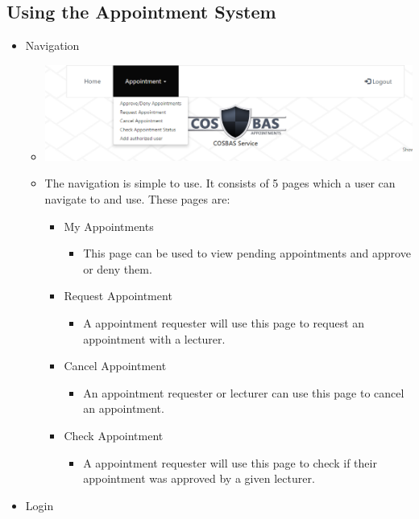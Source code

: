 \subsection{Using the Appointment System}
	\begin{itemize}
		\item Navigation
			\begin{itemize}
				\item \includegraphics[width=\linewidth]{images/Screenshots/Navigation.png}
				\item The navigation is simple to use. It consists of 5 pages which a user can navigate to and use. These pages are:
				\begin{itemize}
					\item My Appointments
						\begin{itemize}
							\item This page can be used to view pending appointments and approve or deny them.
						\end{itemize}
					\item Request Appointment
						\begin{itemize}
							\item A appointment requester will use this page to request an appointment with a lecturer.
						\end{itemize}
					\item Cancel Appointment
						\begin{itemize}
							\item An appointment requester or lecturer can use this page to cancel an appointment.
						\end{itemize}
					\item Check Appointment
						\begin{itemize}
							\item A appointment requester will use this page to check if their appointment was approved by a given lecturer.
						\end{itemize}
				\end{itemize}
			\end{itemize}
		\item Login
			\begin{itemize}

\end{itemize}
\end{itemize}
